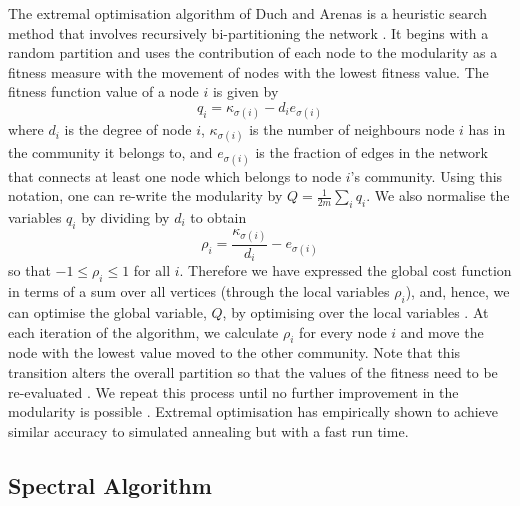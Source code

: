 The extremal optimisation algorithm of Duch and Arenas \cite{DA05} is a heuristic search method that involves recursively bi-partitioning the network \cite{DA05,For10}.
It begins with a random partition and uses the contribution of each node to the modularity as a fitness measure with the movement of nodes with the lowest fitness value.
The fitness function value of a node $i$ is given by
\begin{equation}
	\label{eq:fitnessFunction}
	q_{i} = \kappa_{\sigma(i)} - d_{i}e_{\sigma(i)}
\end{equation}
where $d_{i}$ is the degree of node $i$, $\kappa_{\sigma(i)}$ is the number of neighbours node $i$ has in the community it belongs to, and $e_{\sigma(i)}$ is the fraction of edges in the network that connects at least one node which belongs to node $i$'s community.
Using this notation, one can re-write the modularity by $Q = \frac{1}{2m} \sum_{i} q_{i}$.
We also normalise the variables $q_{i}$ by dividing by $d_{i}$ to obtain
\begin{equation}
	\label{eq:normalisedFitnessFunction}
	\rho_{i} = \frac{\kappa_{\sigma(i)}}{d_{i}} - e_{\sigma(i)}
\end{equation}
so that $-1 \leq \rho_{i}  \leq 1$ for all $i$.
Therefore we have expressed the global cost function in terms of a sum over all vertices (through the local variables $\rho_{i}$), and, hence, we can optimise the global variable, $Q$, by optimising over the local variables \cite{For10}.
At each iteration of the algorithm, we calculate $\rho_{i}$ for every node $i$ and move the node with the lowest value moved to the other community.
Note that this transition alters the overall partition so that the values of the fitness need to be re-evaluated \cite{DA05,For10}.
We repeat this process until no further improvement in the modularity is possible \cite{DA05,For10}.
Extremal optimisation has empirically shown to achieve similar accuracy to simulated annealing but with a fast run time.


\subsection{Spectral Algorithm}
\label{subsec:spectralAlgorithm}

